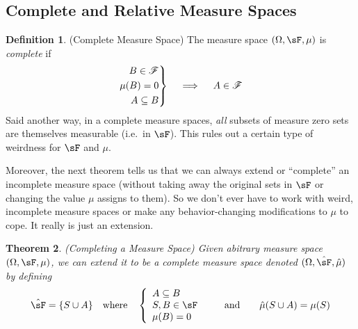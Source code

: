 \documentclass[12pt]{article}
\theoremstyle{plain}
\newtheorem{thm}{Theorem}[section]
\theoremstyle{definition}
\newtheorem{defn}[thm]{Definition}
\theoremstyle{remark}
\newenvironment{rcases}
  {\left.\begin{aligned}}
  {\end{aligned}\right\rbrace}
\begin{document}
\clearpage
\subsection{Complete and Relative Measure Spaces}

\begin{defn}(Complete Measure Space)
The measure space $(\Omega,\sF,\mu)$ is \emph{complete} if
\begin{align*}
  \begin{rcases}
      B\in\mathscr{F} \\
      \mu(B) = 0\\
      A\subseteq B
  \end{rcases}
  \quad \implies\quad
  A\in\mathscr{F}
\end{align*}
Said another way, in a complete measure spaces, \emph{all} subsets of
measure zero sets are themselves measurable (i.e.\ in $\sF$). This rules
out a certain type of weirdness for $\sF$ and $\mu$.

Moreover, the next theorem tells us that we can always extend or
``complete'' an incomplete measure space (without taking away the
original sets in $\sF$ or changing the value $\mu$ assigns to them). So
we don't ever have to work with weird, incomplete measure spaces or make
any behavior-changing modifications to $\mu$ to cope. It really is just
an extension.
\end{defn}

\begin{thm}\emph{(Completing a Measure Space)}
Given abitrary measure space $(\Omega,\sF,\mu)$, we can extend it to be
a \emph{complete} measure space denoted
$(\Omega,\hat{\sF},\hat{\mu})$ by defining
\begin{align*}
  \hat{\sF} = \{S\cup A \}
  \quad \text{where} \quad
  \left\{
      \begin{array}{l}
      A \subseteq B\\
      S, B\in\sF\\
      \mu(B) = 0 \\
  \end{array}
  \right.
  \qquad \text{and} \qquad
  \hat{\mu}(S\cup A) = \mu(S)
\end{align*}
\end{thm}
\end{document}

